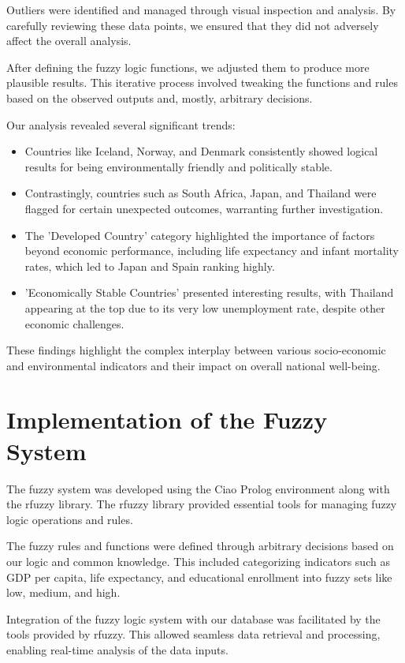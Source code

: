 \documentclass[fleqn,11pt]{article}
\begin{document}
Outliers were identified and managed through visual inspection and analysis. By carefully reviewing these data points, we ensured that they did not adversely affect the overall analysis. 

After defining the fuzzy logic functions, we adjusted them to produce more plausible results. This iterative process involved tweaking the functions and rules based on the observed outputs and, mostly, arbitrary decisions.

Our analysis revealed several significant trends:
\begin{itemize}
    \item Countries like Iceland, Norway, and Denmark consistently showed logical results for being environmentally friendly and politically stable.
    \item Contrastingly, countries such as South Africa, Japan, and Thailand were flagged for certain unexpected outcomes, warranting further investigation.
    \item The 'Developed Country' category highlighted the importance of factors beyond economic performance, including life expectancy and infant mortality rates, which led to Japan and Spain ranking highly.
    \item 'Economically Stable Countries' presented interesting results, with Thailand appearing at the top due to its very low unemployment rate, despite other economic challenges.
\end{itemize}
These findings highlight the complex interplay between various socio-economic and environmental indicators and their impact on overall national well-being.

\section{Implementation of the Fuzzy System}

The fuzzy system was developed using the Ciao Prolog environment along with the rfuzzy library. The rfuzzy library provided essential tools for managing fuzzy logic operations and rules.

The fuzzy rules and functions were defined through arbitrary decisions based on our logic and common knowledge. This included categorizing indicators such as GDP per capita, life expectancy, and educational enrollment into fuzzy sets like low, medium, and high.

Integration of the fuzzy logic system with our database was facilitated by the tools provided by rfuzzy. This allowed seamless data retrieval and processing, enabling real-time analysis of the data inputs.
\end{document}
